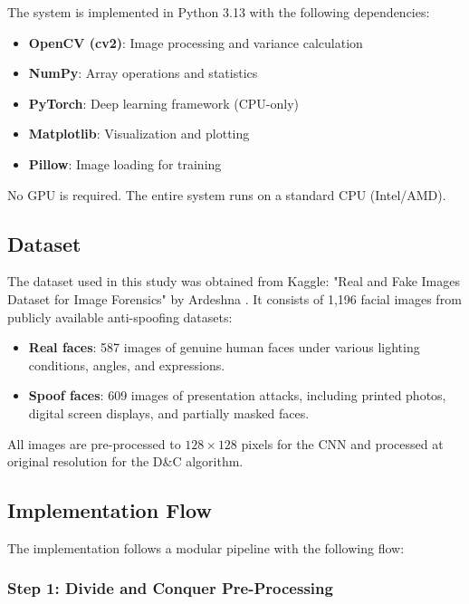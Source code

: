 \documentclass[conference]{IEEEtran}
\begin{document}
The system is implemented in Python 3.13 with the following dependencies:

\begin{itemize}
    \item \textbf{OpenCV (cv2)}: Image processing and variance calculation
    \item \textbf{NumPy}: Array operations and statistics
    \item \textbf{PyTorch}: Deep learning framework (CPU-only)
    \item \textbf{Matplotlib}: Visualization and plotting
    \item \textbf{Pillow}: Image loading for training
\end{itemize}

No GPU is required. The entire system runs on a standard CPU (Intel/AMD).

\subsection{Dataset}

The dataset used in this study was obtained from Kaggle: "Real and Fake Images Dataset for Image Forensics" by Ardeshna \cite{ardeshna2024}. It consists of 1,196 facial images from publicly available anti-spoofing datasets:

\begin{itemize}
    \item \textbf{Real faces}: 587 images of genuine human faces under various lighting conditions, angles, and expressions.
    \item \textbf{Spoof faces}: 609 images of presentation attacks, including printed photos, digital screen displays, and partially masked faces.
\end{itemize}

All images are pre-processed to $128 \times 128$ pixels for the CNN and processed at original resolution for the D\&C algorithm.

\subsection{Implementation Flow}

The implementation follows a modular pipeline with the following flow:

\subsubsection{Step 1: Divide and Conquer Pre-Processing}
\end{document}
